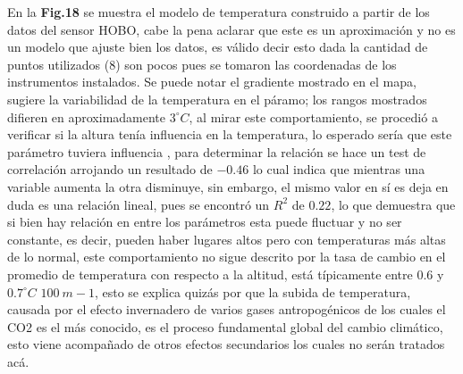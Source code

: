 \documentclass[conference,final,]{IEEEtran}
\begin{document}
En la \textbf{Fig.18} se muestra el modelo de temperatura construido a
partir de los datos del sensor HOBO, cabe la pena aclarar que este es un
aproximación y no es un modelo que ajuste bien los datos, es válido
decir esto dada la cantidad de puntos utilizados (\(8\)) son pocos pues
se tomaron las coordenadas de los instrumentos instalados. Se puede
notar el gradiente mostrado en el mapa, sugiere la variabilidad de la
temperatura en el páramo; los rangos mostrados difieren en
aproximadamente \(3^{\circ}C\), al mirar este comportamiento, se
procedió a verificar si la altura tenía influencia en la temperatura, lo
esperado sería que este parámetro tuviera influencia \cite{basantes},
para determinar la relación se hace un test de correlación arrojando un
resultado de \(-0.46\) lo cual indica que mientras una variable aumenta
la otra disminuye, sin embargo, el mismo valor en sí es deja en duda es
una relación lineal, pues se encontró un \(R^2\) de \(0.22\), lo que
demuestra que si bien hay relación en entre los parámetros esta puede
fluctuar y no ser constante, es decir, pueden haber lugares altos pero
con temperaturas más altas de lo normal, este comportamiento no sigue
descrito por \cite{van} la tasa de cambio en el promedio de temperatura
con respecto a la altitud, está típicamente entre \(0.6\) y
\(0.7^{\circ}C\) \(100 \ m-1\), esto se explica quizás por que la subida
de temperatura, causada por el efecto invernadero de varios gases
antropogénicos de los cuales el CO2 es el más conocido, es el proceso
fundamental global del cambio climático, esto viene acompañado de otros
efectos secundarios \cite{buyta} los cuales no serán tratados acá.
\end{document}
